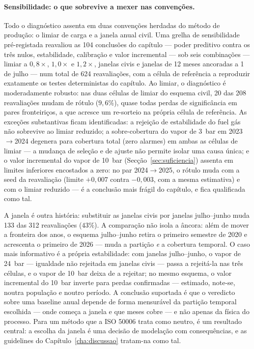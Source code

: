 \paragraph{Sensibilidade: o que sobrevive a mexer nas convenções.} Todo o
diagnóstico assenta em duas convenções herdadas do método de produção: o
limiar de carga e a janela anual civil. Uma grelha de sensibilidade
pré-registada reavaliou as 104 conclusões do capítulo --- poder preditivo
contra os três nulos, estabilidade, calibração e valor incremental --- sob
seis combinações --- limiar a $0{,}8\times$,
$1{,}0\times$ e $1{,}2\times$, janelas civis e janelas de 12 meses ancoradas
a 1 de julho --- num total de 624 reavaliações, com a célula de referência a
reproduzir exatamente os testes deterministas do capítulo. Ao limiar, o
diagnóstico é moderadamente robusto: nas duas células de limiar do esquema
civil, 20 das 208 reavaliações mudam de rótulo ($9{,}6\%$), quase todas
perdas de significância em pares fronteiriços, a que acresce um re-sorteio na
própria célula de referência. As exceções substantivas ficam identificadas:
a rejeição de estabilidade do fuel gás não sobrevive ao limiar reduzido; a
sobre-cobertura do vapor de 3~bar em 2023${\to}$2024 degenera para cobertura
total (zero alarmes) em ambas as células de limiar --- a mudança de seleção e
de ajuste não permite isolar uma causa única; e o valor incremental do vapor
de 10~bar (Secção~\ref{sec:suficiencia}) assenta em limites inferiores
encostados a zero: no par 2024${\to}$2025, o rótulo muda com a seed da
reavaliação (limite $+0{,}007$ contra $-0{,}003$, com a mesma estimativa) e
com o limiar reduzido --- é a conclusão mais frágil do capítulo, e fica
qualificada como tal.

A janela é outra história: substituir as janelas civis por janelas
julho--junho muda 133 das 312 reavaliações ($43\%$). A comparação não isola a
âncora: além de mover a fronteira dos anos, o esquema julho--junho retira o
primeiro semestre de 2020 e acrescenta o primeiro de 2026 --- muda a partição
\emph{e} a cobertura temporal. O caso mais informativo é a própria
estabilidade: com janelas julho--junho, o vapor de 24~bar --- igualdade não
rejeitada em janelas civis --- passa a rejeitá-la nas três células, e o vapor
de 10~bar deixa de a rejeitar; no mesmo esquema, o valor incremental do
10~bar inverte para perdas confirmadas --- estimado, note-se, noutra
população e noutro período. A conclusão suportada é que o veredicto sobre uma
baseline anual depende de forma mensurável da partição temporal escolhida ---
onde começa a janela e que meses cobre --- e não apenas da física do
processo. Para um método que a ISO 50006 trata como neutro, é um resultado
central: a escolha da janela é uma decisão de modelação com consequências, e
as guidelines do Capítulo~\ref{cha:discussao} tratam-na como tal.

